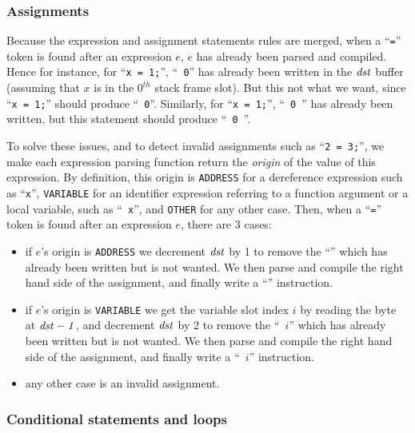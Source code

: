 \subsubsection{Assignments}\label{subsubsection:toyc3-assign}

Because the expression and assignment statements rules are merged, when a
``{\tt =}'' token is found after an expression $e$, $e$ has already been parsed
and compiled. Hence for instance, for ``{\tt x = 1;}'', ``{\tt {} 0}''
has already been written in the $\it{dst}$ buffer (assuming that $x$ is in the
$0^{th}$ stack frame slot). But this not what we want, since ``{\tt x = 1;}''
should produce ``{\tt {}  0}''. Similarly, for ``{\tt *x =
1;}'', ``{\tt {} 0 }'' has already been written, but this
statement should produce ``{\tt {} 0  }''.

To solve these issues, and to detect invalid assignments such as ``{\tt 2 =
3;}'', we make each expression parsing function return the {\em origin} of the
value of this expression. By definition, this origin is {\tt ADDRESS} for a
dereference expression such as ``{\tt *x}'', {\tt VARIABLE} for an identifier
expression referring to a function argument or a local variable, such as ``{\tt
x}'', and {\tt OTHER} for any other case. Then, when a ``{\tt =}'' token is
found after an expression $e$, there are 3 cases:
\begin{itemize}
  \item if $e$'s origin is {\tt ADDRESS} we decrement $\it{dst}$ by 1 to remove
  the ``'' which has already been written but is not wanted. We then
  parse and compile the right hand side of the assignment, and finally write a
  ``'' instruction.

  \item if $e$'s origin is {\tt VARIABLE} we get the variable slot index $i$ by
  reading the byte at $\it{dst}-1$, and decrement $\it{dst}$ by 2 to remove the
  ``{\tt {} $i$}'' which has already been written but is not wanted. We
  then parse and compile the right hand side of the assignment, and finally
  write a ``{\tt {} $i$}'' instruction.

  \item any other case is an invalid assignment.
\end{itemize}

\subsubsection{Conditional statements and
loops}\label{subsubsection:toyc3-if-loop}

